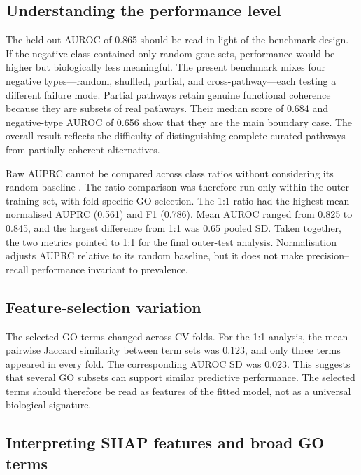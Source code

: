 \documentclass[12pt,twoside]{article}
\begin{document}
\subsection{Understanding the performance level}
\label{sec:disc_performance}

The held-out AUROC of 0.865 should be read in light of the benchmark design. If the negative class contained only random gene sets, performance would be higher but biologically less meaningful. The present benchmark mixes four negative types---random, shuffled, partial, and cross-pathway---each testing a different failure mode. Partial pathways retain genuine functional coherence because they are subsets of real pathways. Their median score of 0.684 and negative-type AUROC of 0.656 show that they are the main boundary case. The overall result reflects the difficulty of distinguishing complete curated pathways from partially coherent alternatives.

Raw AUPRC cannot be compared across class ratios without considering its random baseline \citep{saito2015precision}. The ratio comparison was therefore run only within the outer training set, with fold-specific GO selection. The 1:1 ratio had the highest mean normalised AUPRC (0.561) and F1 (0.786). Mean AUROC ranged from 0.825 to 0.845, and the largest difference from 1:1 was 0.65 pooled SD. Taken together, the two metrics pointed to 1:1 for the final outer-test analysis. Normalisation adjusts AUPRC relative to its random baseline, but it does not make precision--recall performance invariant to prevalence.

\subsection{Feature-selection variation}
\label{sec:disc_feature_variation}

The selected GO terms changed across CV folds. For the 1:1 analysis, the mean pairwise Jaccard similarity between term sets was 0.123, and only three terms appeared in every fold. The corresponding AUROC SD was 0.023. This suggests that several GO subsets can support similar predictive performance. The selected terms should therefore be read as features of the fitted model, not as a universal biological signature.

\subsection{Interpreting SHAP features and broad GO terms}
\label{sec:disc_shap_interpretation}
\end{document}
